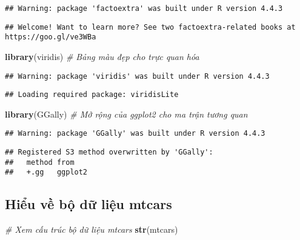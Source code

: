 \documentclass[
]{article}
\newenvironment{Shaded}{\begin{snugshade}}{\end{snugshade}}
\newcommand{\CommentTok}[1]{\textcolor[rgb]{0.56,0.35,0.01}{\textit{#1}}}
\newcommand{\FunctionTok}[1]{\textcolor[rgb]{0.13,0.29,0.53}{\textbf{#1}}}
\newcommand{\NormalTok}[1]{#1}
\begin{document}
\begin{verbatim}
## Warning: package 'factoextra' was built under R version 4.4.3
\end{verbatim}

\begin{verbatim}
## Welcome! Want to learn more? See two factoextra-related books at https://goo.gl/ve3WBa
\end{verbatim}

\begin{Shaded}
\begin{Highlighting}[]
\FunctionTok{library}\NormalTok{(viridis)     }\CommentTok{\# Bảng màu đẹp cho trực quan hóa}
\end{Highlighting}
\end{Shaded}

\begin{verbatim}
## Warning: package 'viridis' was built under R version 4.4.3
\end{verbatim}

\begin{verbatim}
## Loading required package: viridisLite
\end{verbatim}

\begin{Shaded}
\begin{Highlighting}[]
\FunctionTok{library}\NormalTok{(GGally)      }\CommentTok{\# Mở rộng của ggplot2 cho ma trận tương quan}
\end{Highlighting}
\end{Shaded}

\begin{verbatim}
## Warning: package 'GGally' was built under R version 4.4.3
\end{verbatim}

\begin{verbatim}
## Registered S3 method overwritten by 'GGally':
##   method from   
##   +.gg   ggplot2
\end{verbatim}

\subsection{Hiểu về bộ dữ liệu
mtcars}\label{hiux1ec3u-vux1ec1-bux1ed9-dux1eef-liux1ec7u-mtcars}

\begin{Shaded}
\begin{Highlighting}[]
\CommentTok{\# Xem cấu trúc bộ dữ liệu mtcars}
\FunctionTok{str}\NormalTok{(mtcars)}
\end{Highlighting}
\end{Shaded}
\end{document}
